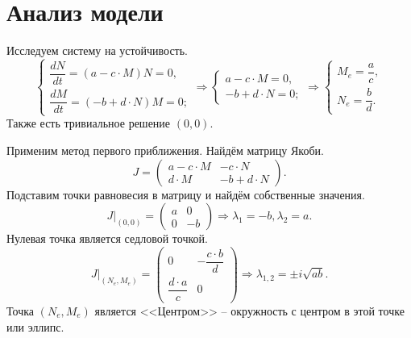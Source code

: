 \section{Анализ модели}
    Исследуем систему на устойчивость.
    \[
        \begin{cases}
            \dfrac{dN}{dt} = (a - c \cdot M) N = 0, \\[.5em]
            \dfrac{dM}{dt} = (-b + d \cdot N) M = 0;
        \end{cases}
        \Rightarrow
        \begin{cases}
            a - c \cdot M = 0, \\[.5em]
            -b + d \cdot N = 0;
        \end{cases}
        \Rightarrow
        \begin{cases}
            M_e = \dfrac{a}{c}, \\[.5em]
            N_e = \dfrac{b}{d}.
        \end{cases}
    \]
    Также есть тривиальное решение $ (0, 0) $.

    Применим метод первого приближения. Найдём матрицу Якоби.
    \[
        J = \left(\begin{matrix}
            a - c \cdot M & -c \cdot N \\
            d \cdot M & -b + d \cdot N
        \end{matrix}\right).
    \]
    Подставим точки равновесия в матрицу и найдём собственные значения.
    \[
        J\big|_{(0,0)} = \left(\begin{matrix}
            a & 0\\
            0 & -b
        \end{matrix}\right)
        \Rightarrow
        \lambda_1 = -b, \lambda_2 = a.
    \]
    Нулевая точка является седловой точкой.
    \[
        J\big|_{(N_e,M_e)} = \left(\begin{matrix}
            0 & -\dfrac{c \cdot b}{d}\\
            \dfrac{d \cdot a}{c} & 0
        \end{matrix}\right)
        \Rightarrow
        \lambda_{1,2} = \pm i \sqrt{ab}.
    \]
    Точка $ (N_e, M_e) $ является <<Центром>> -- окружность с центром в этой точке или эллипс.